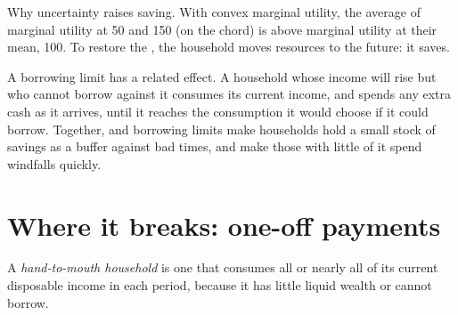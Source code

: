 \begin{omfigure}

{\small Why uncertainty raises saving. With convex marginal utility, the average of marginal utility at 50 and 150 (on the
chord) is above marginal utility at their mean, 100. To restore the , the household moves resources to the
future: it saves.}
\end{omfigure}

A borrowing limit has a related effect. A household whose income will rise but who cannot borrow against it consumes its
current income, and spends any extra cash as it arrives, until it reaches the consumption it would choose if it could
borrow. Together,  and borrowing limits make households hold a small stock of savings as a buffer against bad
times, and make those with little of it spend windfalls quickly.

\section{Where it breaks: one-off payments}\label{sec:b2:consumption:rebates}

\begin{definition}\label{def:b2:consumption:hand-to-mouth}
A \emph{hand-to-mouth household} is one that consumes all or nearly all of its current
disposable income in each period, because it has little liquid wealth or cannot borrow.
\end{definition}

